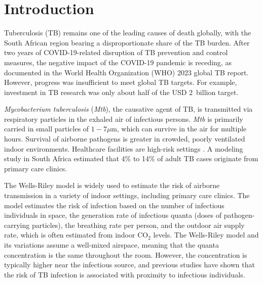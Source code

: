 \documentclass[fleqn,11pt]{wlscirep}
\begin{document}
\newpage

\section*{Introduction} 

Tuberculosis (TB) remains one of the leading causes of death globally, with the South African region bearing a disproportionate share of the TB burden.  After two years of COVID-19-related disruption of TB prevention and control measures, the negative impact of the COVID-19 pandemic is receding, as documented in the World Health Organization (WHO) 2023 global TB report\cite{WHO2023TBReport}. However, progress was insufficient to meet global TB targets\cite{WHO2023TBReport}. For example, investment in TB research was only about half of the USD 2~billion target\cite{WHO2023TBReport}.

\emph{Mycobacterium tuberculosis} (\emph{Mtb}), the causative agent of TB, is transmitted via respiratory particles in the exhaled air of infectious persons\cite{Rieder1999,Patterson2021Tuberculosis}. \emph{Mtb} is primarily carried in small particles of $1-7\mu$m\cite{Fennelly2020Lancet}, which can survive in the air for multiple hours\cite{Loudon1969AMRRD}. Survival of airborne pathogens is greater in crowded, poorly ventilated indoor environments\cite{Rieder1999,CPS2013Book,Nardell1991ARRD,Wang2021Science,Morawska2021}. Healthcare facilities are high-risk settings \cite{McCreesh2020IJTLD}. A modeling study in South Africa estimated that 4\% to 14\% of adult TB cases originate from primary care clinics\cite{McCreesh2022BMJGlobalHealth}.

The Wells-Riley model\cite{Riley1961Book} is widely used to estimate the risk of airborne transmission in a variety of indoor settings\cite{Haddrell2024NatCommun,Andrews2014JID,Taylor2016IJTLD,Hella2017JInfect,Zemouri2020JDR}, including primary care clinics\cite{Zurcher2022JID,McCreesh2021BMJGlobalHealth}. The model estimates the risk of infection based on the number of infectious individuals in space, the generation rate of infectious quanta (doses of pathogen-carrying particles), the breathing rate per person, and the outdoor air supply rate, which is often estimated from indoor CO$_2$ levels\cite{Rudnick2003IndoorAir,Richardson2014PONE,Haddrell2024NatCommun}. The Wells-Riley model and its variations\cite{Rudnick2003IndoorAir} assume a well-mixed airspace, meaning that the quanta concentration is the same throughout the room. However, the concentration is typically higher near the infectious source\cite{Wang2021Science,Vuorinen2020SafSci,Chen2020BuildEnv}, and previous studies have shown that the risk of TB infection is associated with proximity to infectious individuals\cite{Ko2004RiskAnal,Kenyon1996NEJM}.
\end{document}
